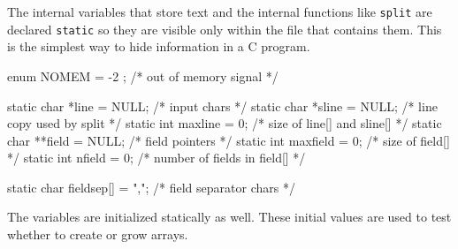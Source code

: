 The internal variables that store text and the internal functions like
\verb'split' are declared \verb'static' so they are visible only within the
file that contains them.  This is the simplest way to hide information in a
C program.
\begin{wellcode}
    enum { NOMEM = -2 };            /* out of memory signal */

    static char *line       = NULL; /* input chars */
    static char *sline      = NULL; /* line copy used by split */
    static int  maxline     = 0;    /* size of line[] and sline[] */
    static char **field     = NULL; /* field pointers */
    static int  maxfield    = 0;    /* size of field[] */
    static int  nfield      = 0;    /* number of fields in field[] */

    static char fieldsep[]  = ",";  /* field separator chars */
\end{wellcode}
The variables are initialized statically as well. These initial values are
used to test whether to create or grow arrays.

